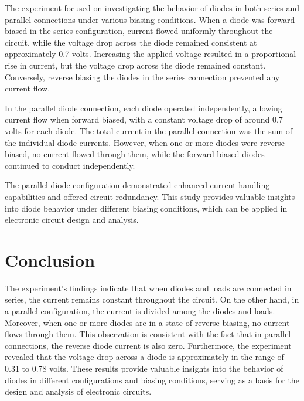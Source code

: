 The experiment focused on investigating the behavior of diodes in both series and parallel connections under various biasing conditions. When a diode was forward biased in the series configuration, current flowed uniformly throughout the circuit, while the voltage drop across the diode remained consistent at approximately 0.7 volts. Increasing the applied voltage resulted in a proportional rise in current, but the voltage drop across the diode remained constant. Conversely, reverse biasing the diodes in the series connection prevented any current flow.

In the parallel diode connection, each diode operated independently, allowing current flow when forward biased, with a constant voltage drop of around 0.7 volts for each diode. The total current in the parallel connection was the sum of the individual diode currents. However, when one or more diodes were reverse biased, no current flowed through them, while the forward-biased diodes continued to conduct independently.

The parallel diode configuration demonstrated enhanced current-handling capabilities and offered circuit redundancy. This study provides valuable insights into diode behavior under different biasing conditions, which can be applied in electronic circuit design and analysis.
\section{Conclusion}
The experiment's findings indicate that when diodes and loads are connected in series, the current remains constant throughout the circuit. On the other hand, in a parallel configuration, the current is divided among the diodes and loads. Moreover, when one or more diodes are in a state of reverse biasing, no current flows through them. This observation is consistent with the fact that in parallel connections, the reverse diode current is also zero. Furthermore, the experiment revealed that the voltage drop across a diode is approximately in the range of 0.31 to 0.78 volts. These results provide valuable insights into the behavior of diodes in different configurations and biasing conditions, serving as a basis for the design and analysis of electronic circuits.
\newpage

